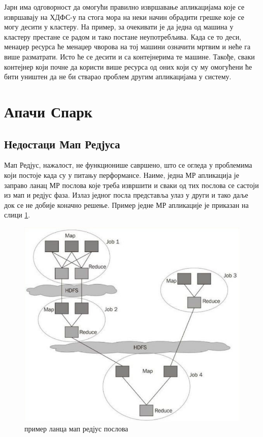 \documentclass[12pt,oneside]{memoir}
\begin{document}
Јарн има одговорност да омогући правилно извршавање апликацијама које се извршавају на ХДФС-у па стога мора на неки начин обрадити грешке које се могу десити у кластеру. На пример, за очекивати је да једна од машина у кластеру престане се радом и тако постане неупотребљива. Када се то деси, менаџер ресурса ће менаџер чворова на тој машини означити мртвим и неће га више разматрати. Исто ће се десити и са контејнерима те машине. Такође, сваки контејнер који почне да користи више ресурса од оних који су му омогућени ће бити уништен да не би стварао проблем другим апликацијама у систему. \cite{hadoop_learning}

\section{Апачи Спарк}
\label{sec:spark}

\subsection{Недостаци Мап Редјуса}
\label{subsec:nedost_mr}

Мап Редјус, нажалост, не функционише савршено, што се огледа у проблемима који постоје када су у питању перформансе. Наиме, једна МР апликација је заправо ланац МР послова које треба извршити и сваки од тих послова се састоји из мап и редјус фаза. Излаз једног посла представља улаз у други и тако даље док се не добије коначно решење. Пример једне МР апликације је приказан на слици \ref{fig:mr_app_example}.

\begin{figure}[!ht]
  \centering
  \includegraphics[width=1\textwidth]{pictures/mr_app.png}
  \caption{пример ланца мап редјус послова}
  \label{fig:mr_app_example}
\end{figure}
\end{document}
